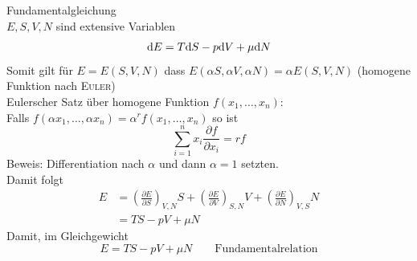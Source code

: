 Fundamentalgleichung \\
$E, S, V, N$ sind extensive Variablen
\begin{equation}
  \mathrm{d} E = T \mathrm{d} S - p \mathrm{d} V + \mu \mathrm{d} N
\end{equation}
Somit gilt für $E=E(S, V, N)$ dass $E(\alpha S, \alpha V, \alpha N) = \alpha E(S, V, N)$ (homogene Funktion nach \textsc{Euler}) \\
Eulerscher Satz über homogene Funktion $f(x_1, \ldots, x_n)$: \\
Falls $f(\alpha x_1, \ldots, \alpha x_n) = \alpha^r f(x_1, \ldots, x_n)$ so ist
\begin{equation}
  \sum_{i=1}^{n} x_i \frac{\partial f}{\partial x_i} = r f
\end{equation}
Beweis: Differentiation nach $\alpha$ und dann $\alpha = 1$ setzten. \\[\baselineskip]
Damit folgt 
\begin{equation}
\begin{split}
  E &= \left( \frac{\partial E}{\partial S} \right)_{V, N} S + \left( \frac{\partial E}{\partial V} \right)_{S, N} V + \left( \frac{\partial E}{\partial N} \right)_{V, S} N \\ 
  &= T S - p V + \mu N
\end{split}
\end{equation}
Damit, im Gleichgewicht
\begin{equation}
  E = T S - p V + \mu N \qquad \text{Fundamentalrelation}
\end{equation}